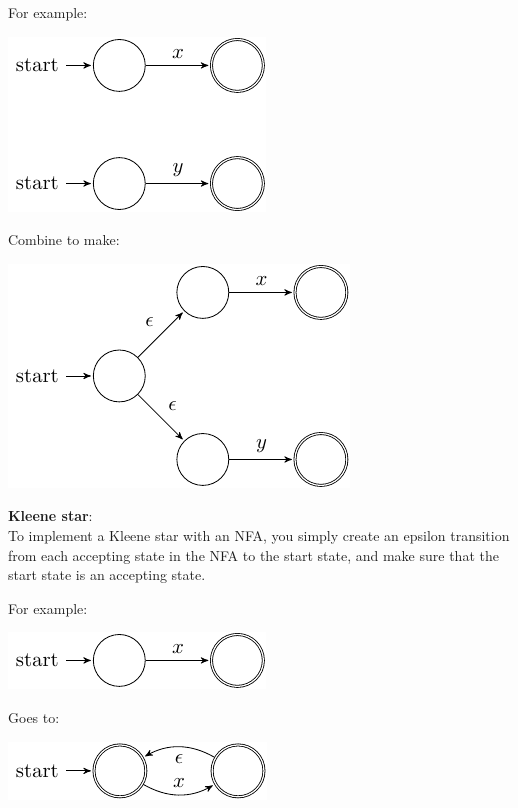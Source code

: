 \begin{description}
    For example:

    \begin{center}
      \includegraphics{automata/18.pdf}
    \end{center}

    Combine to make:

    \begin{center}
      \includegraphics{automata/19.pdf}
    \end{center}

  \item {\bf Kleene star}:\\

    To implement a Kleene star with an NFA, you simply create an epsilon
    transition from each accepting state in the NFA to the start state, and
    make sure that the start state is an accepting state.

    For example:

    \begin{center}
      \includegraphics{automata/20.pdf}
    \end{center}

    Goes to:

    \begin{center}
      \includegraphics{automata/21.pdf}
    \end{center}


\end{description}

